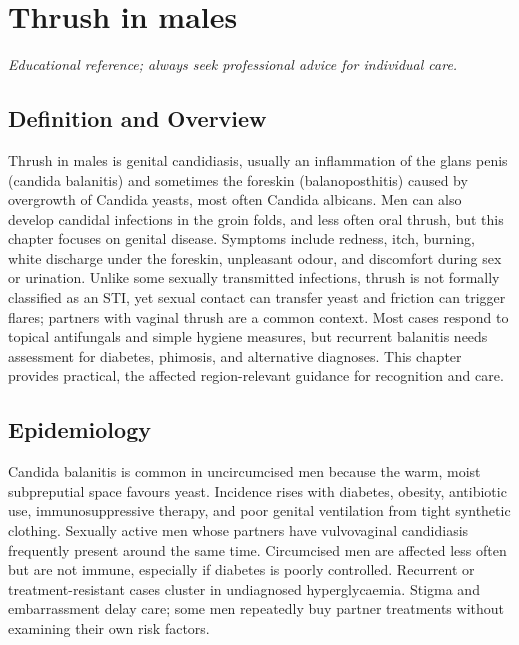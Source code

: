 \chapter{Thrush in males}

\medskip
\noindent\textit{Educational reference; always seek professional advice for individual care.}

\section*{Definition and Overview}
Thrush in males is genital candidiasis, usually an inflammation of the glans penis (candida balanitis) and sometimes the foreskin (balanoposthitis) caused by overgrowth of Candida yeasts, most often Candida albicans. Men can also develop candidal infections in the groin folds, and less often oral thrush, but this chapter focuses on genital disease. Symptoms include redness, itch, burning, white discharge under the foreskin, unpleasant odour, and discomfort during sex or urination. Unlike some sexually transmitted infections, thrush is not formally classified as an STI, yet sexual contact can transfer yeast and friction can trigger flares; partners with vaginal thrush are a common context. Most cases respond to topical antifungals and simple hygiene measures, but recurrent balanitis needs assessment for diabetes, phimosis, and alternative diagnoses. This chapter provides practical, the affected region-relevant guidance for recognition and care.

\section*{Epidemiology}
Candida balanitis is common in uncircumcised men because the warm, moist subpreputial space favours yeast. Incidence rises with diabetes, obesity, antibiotic use, immunosuppressive therapy, and poor genital ventilation from tight synthetic clothing. Sexually active men whose partners have vulvovaginal candidiasis frequently present around the same time. Circumcised men are affected less often but are not immune, especially if diabetes is poorly controlled. Recurrent or treatment-resistant cases cluster in undiagnosed hyperglycaemia. Stigma and embarrassment delay care; some men repeatedly buy partner treatments without examining their own risk factors.

